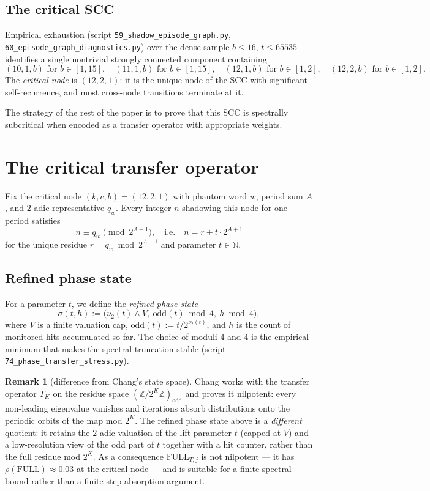 \documentclass[11pt,a4paper]{article}
\theoremstyle{definition}
\newtheorem{remark}[theorem]{Remark}
\newcommand{\Z}{\mathbb{Z}}
\newcommand{\N}{\mathbb{N}}
\newcommand{\full}{\mathrm{FULL}}
\newcommand{\spec}{\rho}
\begin{document}
\subsection{The critical SCC}

Empirical exhaustion (script \verb|59_shadow_episode_graph.py|,
\verb|60_episode_graph_diagnostics.py|) over the dense sample
$b \le 16$, $t \le 65535$ identifies a single nontrivial strongly
connected component containing
\[
(10,1,b) \text{ for } b \in [1,15], \quad
(11,1,b) \text{ for } b \in [1,15], \quad
(12,1,b) \text{ for } b \in [1,2], \quad
(12,2,b) \text{ for } b \in [1,2].
\]
The \emph{critical node} is $(12, 2, 1)$: it is the unique node of
the SCC with significant self-recurrence, and most cross-node
transitions terminate at it.

The strategy of the rest of the paper is to prove that this SCC is
spectrally subcritical when encoded as a transfer operator with
appropriate weights.

\section{The critical transfer operator}
\label{sec:operator}

Fix the critical node $(k,c,b) = (12,2,1)$ with phantom word $w$,
period sum $A$, and $2$-adic representative $q_w$. Every integer $n$
shadowing this node for one period satisfies
\[
n \equiv q_w \pmod{2^{A+1}},
\quad\text{i.e.}\quad
n = r + t \cdot 2^{A+1}
\]
for the unique residue $r = q_w \bmod 2^{A+1}$ and parameter
$t \in \N$.

\subsection{Refined phase state}

For a parameter $t$, we define the \emph{refined phase state}
\[
\sigma(t, h) := \bigl(\nu_2(t)\wedge V,\ \mathrm{odd}(t) \bmod 4,\ h \bmod 4\bigr),
\]
where $V$ is a finite valuation cap, $\mathrm{odd}(t) := t / 2^{\nu_2(t)}$,
and $h$ is the count of monitored hits accumulated so far. The
choice of moduli $4$ and $4$ is the empirical minimum that makes
the spectral truncation stable (script
\verb|74_phase_transfer_stress.py|).

\begin{remark}[difference from Chang's state space]
\label{rem:state-space}
Chang \cite[Sect.~9, Rem.~9.17]{chang2026} works with the transfer
operator $T_K$ on the residue space $(\Z/2^K\Z)_{\mathrm{odd}}$ and
proves it nilpotent: every non-leading eigenvalue vanishes and
iterations absorb distributions onto the periodic orbits of the
map mod $2^K$. The refined phase state above is a \emph{different}
quotient: it retains the $2$-adic valuation of the lift parameter
$t$ (capped at $V$) and a low-resolution view of the odd part of
$t$ together with a hit counter, rather than the full residue mod
$2^K$. As a consequence $\full_{T,j}$ is not nilpotent --- it has
$\spec(\full) \approx 0.03$ at the critical node --- and is
suitable for a finite spectral bound rather than a finite-step
absorption argument.
\end{remark}
\end{document}
